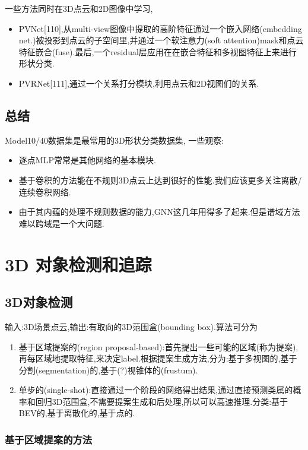 \documentclass{article}
\begin{document}
一些方法同时在3D点云和2D图像中学习,
\begin{itemize}
    \item PVNet[110],从multi-view图像中提取的高阶特征通过一个嵌入网络(embedding net.)被投影到点云的子空间里,并通过一个软注意力(soft attention)mask和点云特征嵌合(fuse).最后,一个residual层应用在在嵌合特征和多视图特征上来进行形状分类.
    \item PVRNet[111],通过一个关系打分模块,利用点云和2D视图们的关系.
\end{itemize}

\subsection{总结}

Model10/40数据集是最常用的3D形状分类数据集,
一些观察:
\begin{itemize}
    \item 逐点MLP常常是其他网络的基本模块.
    \item 基于卷积的方法能在不规则3D点云上达到很好的性能.我们应该更多关注离散/连续卷积网络.
    \item 由于其内蕴的处理不规则数据的能力,GNN这几年用得多了起来.但是谱域方法难以跨域是一个大问题.
\end{itemize}

\section{3D 对象检测和追踪}

\subsection{3D对象检测}

输入:3D场景点云,输出:有取向的3D范围盒(bounding box).算法可分为
\begin{enumerate}
    \item 基于区域提案的(region proposal-based):首先提出一些可能的区域(称为提案),再每区域地提取特征,来决定label.根据提案生成方法,分为:基于多视图的,基于分割(segmentation)的,基于(?)视锥体的(frustum).
    \item 单步的(single-shot):直接通过一个阶段的网络得出结果,通过直接预测类属的概率和回归3D范围盒,不需要提案生成和后处理,所以可以高速推理.分类:基于BEV的,基于离散化的,基于点的.
\end{enumerate}
\subsubsection{基于区域提案的方法}
\end{document}
